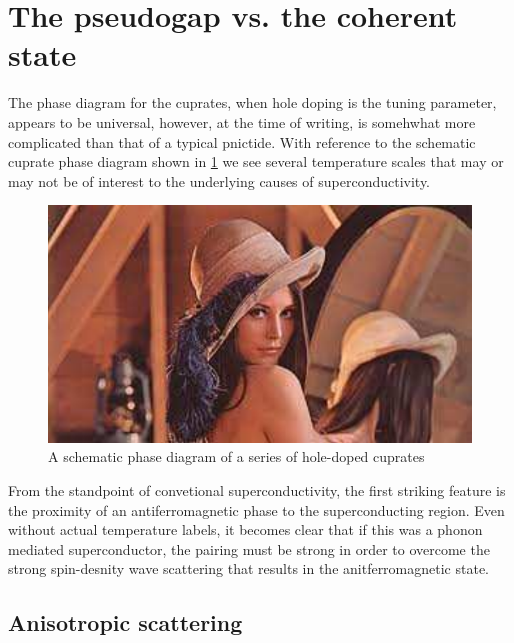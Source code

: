 
\section{The pseudogap vs. the coherent state}

The phase diagram for the cuprates, when hole doping is the tuning parameter, appears to be universal, however, at the time of writing, is somehwhat more complicated than that of a typical pnictide. With reference to the schematic cuprate phase diagram shown in \fig\ref{Fig:1:UniversalCupratePhaseDiagram} we see several temperature scales that may or may not be of interest to the underlying causes of \highTc superconductivity.
\begin{figure}[htbp]
    \begin{center}
        \includegraphics[scale=0.7]{Misc/TODO}
        \caption{A schematic phase diagram of a series of hole-doped cuprates}
        \label{Fig:1:UniversalCupratePhaseDiagram}
    \end{center}
\end{figure}
From the standpoint of convetional superconductivity, the first striking feature is the proximity of an antiferromagnetic phase to the superconducting region. Even without actual temperature labels, it becomes clear that if this was a phonon mediated superconductor, the pairing must be strong in order to overcome the strong spin-desnity wave scattering that results in the anitferromagnetic state.


\subsection{Anisotropic scattering}


